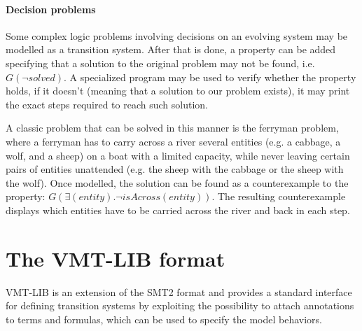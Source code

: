 \paragraph*{Decision problems} Some complex logic problems involving decisions on an evolving system may be modelled as a transition system.
After that is done, a property can be added specifying that a solution to the original problem may not be found, i.e. \begin{math} G (\lnot solved) \end{math}.
A specialized program may be used to verify whether the property holds, if it doesn't (meaning that a solution to our problem exists), it may print the exact steps required to reach such solution.

A classic problem that can be solved in this manner is the ferryman problem, where a ferryman has to carry across a river several entities (e.g. a cabbage, a wolf, and a sheep) on a boat with a limited capacity, while never leaving certain pairs of entities unattended (e.g. the sheep with the cabbage or the sheep with the wolf).
Once modelled, the solution can be found as a counterexample to the property:
\begin{math}
    G (\exists (entity). \lnot isAcross(entity))
\end{math}.
The resulting counterexample displays which entities have to be carried across the river and back in each step.

\section{The VMT-LIB format}
VMT-LIB is an extension of the SMT2 format and provides a standard interface for defining transition systems by exploiting the possibility to attach annotations to terms and formulas, which can be used to specify the model behaviors. \cite{VMT-LIB}

